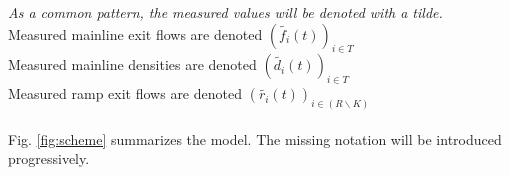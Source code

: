 \emph{As a common pattern, the measured values will be denoted with a tilde.}\\
Measured mainline exit flows are denoted $(\widetilde{f_{i}}(t))_{i\in{T}}$\\
Measured mainline densities are denoted $(\widetilde{d_{i}}(t))_{i\in{T}}$\\
Measured ramp exit flows are denoted $(\widetilde{r_{i}}(t))_{i\in{(R\backslash K)}}$\\
\\
Fig.	 \ref{fig:scheme} summarizes the model. The missing notation will be introduced progressively. \\


